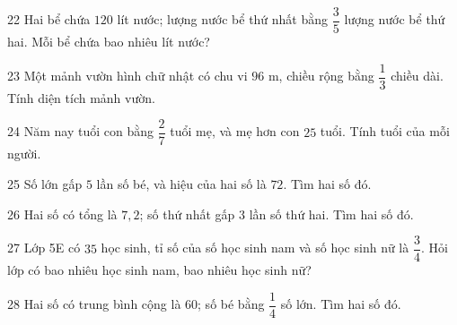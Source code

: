 \gap
\begin{probbox}{22}{\relax}
Hai bể chứa $120$ lít nước; lượng nước bể thứ nhất bằng $\dfrac35$ lượng nước bể thứ hai. Mỗi bể chứa bao nhiêu lít nước?
\end{probbox}
\gap
\begin{probbox}{23}{\relax}
Một mảnh vườn hình chữ nhật có chu vi $96$ m, chiều rộng bằng $\dfrac13$ chiều dài. Tính diện tích mảnh vườn.
\end{probbox}
\gap
\begin{probbox}{24}{\relax}
Năm nay tuổi con bằng $\dfrac27$ tuổi mẹ, và mẹ hơn con $25$ tuổi. Tính tuổi của mỗi người.
\end{probbox}
\gap
\begin{probbox}{25}{\relax}
Số lớn gấp $5$ lần số bé, và hiệu của hai số là $72$. Tìm hai số đó.
\end{probbox}
\gap
\begin{probbox}{26}{\relax}
Hai số có tổng là $7{,}2$; số thứ nhất gấp $3$ lần số thứ hai. Tìm hai số đó.
\end{probbox}
\gap
\begin{probbox}{27}{\relax}
Lớp 5E có $35$ học sinh, tỉ số của số học sinh nam và số học sinh nữ là $\dfrac34$. Hỏi lớp có bao nhiêu học sinh nam, bao nhiêu học sinh nữ?
\end{probbox}
\gap
\begin{probbox}{28}{\relax}
Hai số có trung bình cộng là $60$; số bé bằng $\dfrac14$ số lớn. Tìm hai số đó.
\end{probbox}
